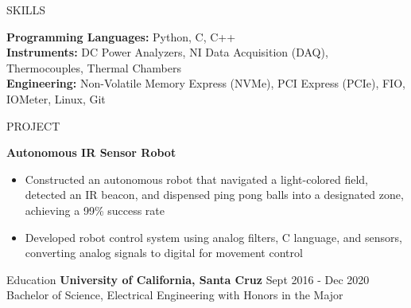 \documentclass{resume} %
\begin{document}
\begin{rSection}{SKILLS}


\textbf{Programming Languages: }Python, C, C++ \\
\textbf{Instruments: }DC Power Analyzers, NI Data Acquisition (DAQ), Thermocouples, Thermal Chambers\\
\textbf{Engineering: }Non-Volatile Memory Express (NVMe), PCI Express (PCIe), FIO, IOMeter, Linux, Git 
\end{rSection}


\begin{rSection}{PROJECT}

 \textbf{Autonomous IR Sensor Robot} \hfill {}
  \begin{itemize}[left=1em]
  \itemsep -0.5em \vspace{-0.5em}
    \item Constructed an autonomous robot that navigated a light-colored field, detected an IR beacon, and dispensed ping pong balls into a designated zone, achieving a 99\% success rate
    \item Developed robot control system using analog filters, C language, and sensors, converting analog signals to digital for movement control
  \end{itemize}


\end{rSection}

\begin{rSection}{Education}
{\bf University of California, Santa Cruz} \hfill {Sept 2016 - Dec 2020} 
\\ Bachelor of Science, Electrical Engineering with Honors in the Major\hfill 

\end{rSection}

\end{document}
